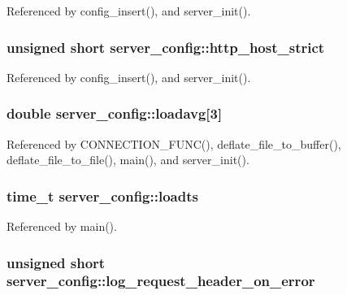 Referenced by config\-\_\-insert(), and server\-\_\-init().

\hypertarget{structserver__config_a34848b2951593edb4ef89616f3ae49c2}{
\subsubsection[{http\-\_\-host\-\_\-strict}]{\setlength{\rightskip}{0pt plus 5cm}unsigned short server\-\_\-config\-::http\-\_\-host\-\_\-strict}}\label{structserver__config_a34848b2951593edb4ef89616f3ae49c2}


Referenced by config\-\_\-insert(), and server\-\_\-init().

\hypertarget{structserver__config_ac086f0477e0bb6a75b54e95cde83189e}{
\subsubsection[{loadavg}]{\setlength{\rightskip}{0pt plus 5cm}double server\-\_\-config\-::loadavg\mbox{[}3\mbox{]}}}\label{structserver__config_ac086f0477e0bb6a75b54e95cde83189e}


Referenced by C\-O\-N\-N\-E\-C\-T\-I\-O\-N\-\_\-\-F\-U\-N\-C(), deflate\-\_\-file\-\_\-to\-\_\-buffer(), deflate\-\_\-file\-\_\-to\-\_\-file(), main(), and server\-\_\-init().

\hypertarget{structserver__config_a2209aca71a689ddbb02883b9cc955a87}{
\subsubsection[{loadts}]{\setlength{\rightskip}{0pt plus 5cm}time\-\_\-t server\-\_\-config\-::loadts}}\label{structserver__config_a2209aca71a689ddbb02883b9cc955a87}


Referenced by main().

\hypertarget{structserver__config_afcdd28bd473ac841d89ebee1162033c8}{
\subsubsection[{log\-\_\-request\-\_\-header\-\_\-on\-\_\-error}]{\setlength{\rightskip}{0pt plus 5cm}unsigned short server\-\_\-config\-::log\-\_\-request\-\_\-header\-\_\-on\-\_\-error}}\label{structserver__config_afcdd28bd473ac841d89ebee1162033c8}


